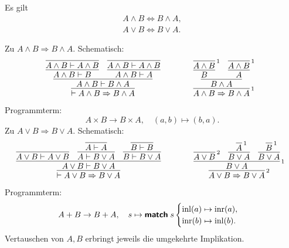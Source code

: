 \begin{Satz}[Kommutativgesetze]%
\label{bool-cl}
Es gilt
\begin{gather*}
A\land B \iff B\land A,\\
A\lor B \iff B\lor A.
\end{gather*}
\end{Satz}
\begin{Beweis}[Beweis]
Zu $A\land B\Rightarrow B\land A$. Schematisch:
\[
\begin{array}{@{}l@{\qquad\qquad}l}
\infer{\vdash A\land B\Rightarrow B\land A}{
  \infer{A\land B\vdash B\land A}{
    \infer{A\land B\vdash B}{
      \infer{A\land B\vdash A\land B}{}}
    & \infer{A\land B\vdash A}{
      \infer{A\land B\vdash A\land B}{}}}}
&
\infer[\infernote{1}]{A\land B\Rightarrow B\land A}{
  \infer{B\land A}{
     \infer{B}{\infer[\infernote{1}]{A\land B}{}}
     & \infer{A}{\infer[\infernote{1}]{A\land B}{}}}}
\end{array}
\]
Programmterm:
\[A\times B\to B\times A,\quad (a,b)\mapsto (b,a).\]
Zu $A\lor B\Rightarrow B\lor A$. Schematisch:
\[
\begin{array}{@{}l@{\qquad\qquad}l}
\infer{\vdash A\lor B\Rightarrow B\lor A}{
  \infer{A\lor B\vdash B\lor A}{
    \infer{A\lor B\vdash A\lor B}{}
    & \infer{A\vdash B\lor A}{
        \infer{A\vdash A}{}}
    & \infer{B\vdash B\lor A}{
        \infer{B\vdash B}{}}}}
&
\infer[\infernote{2}]{A\lor B\Rightarrow B\lor A}{
  \infer[\infernote{1}]{B\lor A}{
    \infer[\infernote{2}]{A\lor B}{}
    & \infer{B\lor A}{\infer[\infernote{1}]{A}{}}
    & \infer{B\lor A}{\infer[\infernote{1}]{B}{}}}}
\end{array}
\]
Programmterm:
\[A+B\to B+A,\quad s\mapsto\text{{\normalfont\sffamily\bfseries match}}\; s\begin{cases}
\operatorname{inl}(a)\mapsto \operatorname{inr}(a),\\
\operatorname{inr}(b)\mapsto \operatorname{inl}(b).
\end{cases}\]
Vertauschen von $A,B$ erbringt jeweils die umgekehrte Implikation.\;\qedsymbol
\end{Beweis}

